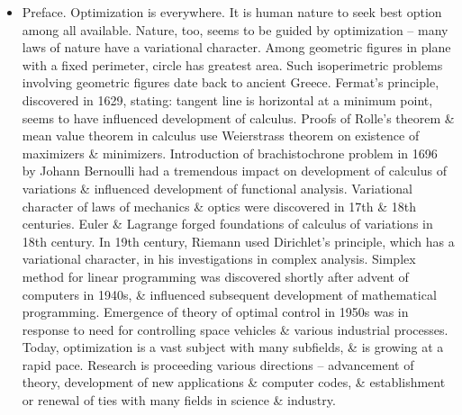 \documentclass{article}
\begin{document}
\begin{itemize}
    \item {\sf Preface.} Optimization is everywhere. It is human nature to seek best option among all available. Nature, too, seems to be guided by optimization -- many laws of nature have a variational character. Among geometric figures in plane with a fixed perimeter, circle has greatest area. Such isoperimetric problems involving geometric figures date back to ancient Greece. Fermat's principle, discovered in 1629, stating: tangent line is horizontal at a minimum point, seems to have influenced development of calculus. Proofs of Rolle's theorem \& mean value theorem in calculus use Weierstrass theorem on existence of maximizers \& minimizers. Introduction of brachistochrone problem in 1696 by {\sc Johann Bernoulli} had a tremendous impact on development of calculus of variations \& influenced development of functional analysis. Variational character of laws of mechanics \& optics were discovered in 17th \& 18th centuries. Euler \& Lagrange forged foundations of calculus of variations in 18th century. In 19th century, {\sc Riemann} used Dirichlet's principle, which has a variational character, in his investigations in complex analysis. Simplex method for linear programming was discovered shortly after advent of computers in 1940s, \& influenced subsequent development of mathematical programming. Emergence of theory of optimal control in 1950s was in response to need for controlling space vehicles \& various industrial processes. Today, optimization is a vast subject with many subfields, \& is growing at a rapid pace. Research is proceeding various directions -- advancement of theory, development of new applications \& computer codes, \& establishment or renewal of ties with many fields in science \& industry.
    

\end{itemize}
\end{document}
